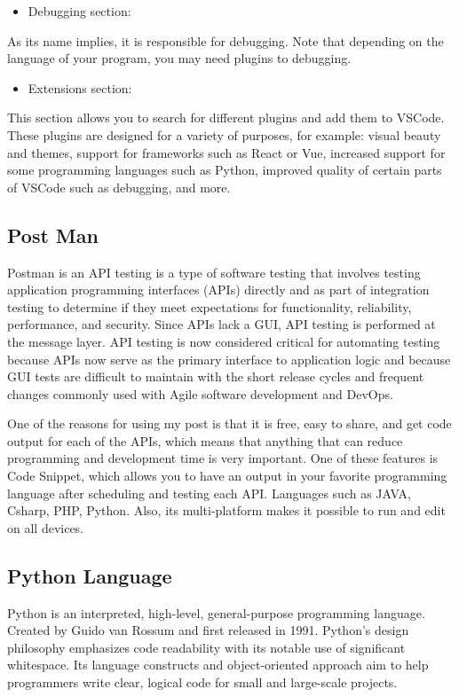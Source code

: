 \begin{itemize}
\item Debugging section: 
\end{itemize}
As its name implies, it is responsible for debugging. Note that depending on the language of your program, you may need plugins to debugging.

\begin{itemize}
\item Extensions section: 
\end{itemize}
This section allows you to search for different plugins and add them to VSCode. These plugins are designed for a variety of purposes, for example: visual beauty and themes, support for frameworks such as React or Vue, increased support for some programming languages such as Python, improved quality of certain parts of VSCode such as debugging, and more.

\subsection{Post Man}
Postman is an API testing is a type of software testing that involves testing application programming interfaces (APIs) directly and as part of integration testing to determine if they meet expectations for functionality, reliability, performance, and security. Since APIs lack a GUI, API testing is performed at the message layer. API testing is now considered critical for automating testing because APIs now serve as the primary interface to application logic and because GUI tests are difficult to maintain with the short release cycles and frequent changes commonly used with Agile software development and DevOps.\textcite{wiki:API_testing}

One of the reasons for using my post is that it is free, easy to share, and get code output for each of the APIs, which means that anything that can reduce programming and development time is very important. One of these features is Code Snippet, which allows you to have an output in your favorite programming language after scheduling and testing each API. Languages such as JAVA, Csharp, PHP, Python. Also, its multi-platform makes it possible to run and edit on all devices.

\subsection{Python Language}
Python is an interpreted, high-level, general-purpose programming language. Created by Guido van Rossum and first released in 1991. Python's design philosophy emphasizes code readability with its notable use of significant whitespace. Its language constructs and object-oriented approach aim to help programmers write clear, logical code for small and large-scale projects.

